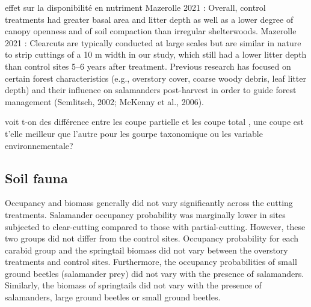 effet sur la disponibilité en nutriment
Mazerolle 2021 : Overall, control treatments had greater basal area and litter depth as well as a lower degree of canopy openness and of soil compaction than irregular shelterwoods.
Mazerolle 2021 : Clearcuts are typically conducted at large scales but are similar in nature to strip cuttings of a 10 m width in our study, which still had a lower litter depth than control sites 5–6 years after treatment.
Previous research has focused on certain forest characteristics (e.g., overstory cover, coarse woody debris, leaf litter depth) and their influence on salamanders post-harvest in order to guide forest management (Semlitsch, 2002; McKenny et al., 2006).

voit t-on des différence entre les coupe partielle et les coupe total , une coupe est t'elle meilleur que l'autre pour les gourpe taxonomique ou les variable environnementale?


\subsection*{Soil fauna}
\label{disc:soil_fauna}



Occupancy and biomass generally did not vary significantly across the cutting treatments. 
Salamander occupancy probability was marginally lower in sites subjected to clear-cutting compared to those with partial-cutting. However, these two groups did not differ from the control sites. 
Occupancy probability for each carabid group and the springtail biomass did not vary between the overstory treatments and control sites. 
Furthermore, the occupancy probabilities of small ground beetles (salamander prey) did not vary with the presence of salamanders. 
Similarly, the biomass of springtails did not vary with the presence of salamanders, large ground beetles or small ground beetles.



